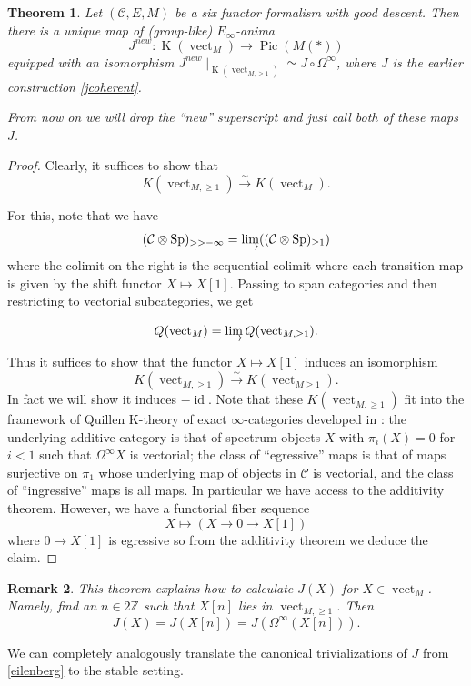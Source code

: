 \documentclass[12pt]{article}
\newtheorem{theorem}{Theorem}[section]
\newtheorem{remark}[theorem]{Remark}
\newcommand{\on}{\operatorname}
\newcommand{\mc}{\mathcal}
\newcommand{\mbb}{\mathbb}
\begin{document}
\begin{theorem}\label{jextend}
Let $(\mc{C},E,M)$ be a six functor formalism with good descent.  Then there is a unique map of (group-like) $E_\infty$-anima
$$J^{new}:\on{K}(\on{vect}_M)\to \on{Pic}(M(\ast))$$
equipped with an isomorphism $J^{new}\mid_{\on{K}(\on{vect}_{M,\geq 1})}\simeq  J\circ \Omega^\infty$, where $J$ is the earlier construction \ref{jcoherent}.

From now on we will drop the ``new'' superscript and just call both of these maps $J$.
\end{theorem}
\begin{proof}
Clearly, it suffices to show that
$$K(\on{vect}_{M,\geq 1})\overset{\sim}{\rightarrow} K(\on{vect}_M).$$

For this, note that we have
$$(\mc{C}\otimes \on{Sp})_{>>-\infty} = \varinjlim ((\mc{C}\otimes \on{Sp})_{\geq 1})$$
where the colimit on the right is the sequential colimit where each transition map is given by the shift functor $X\mapsto X[1]$. Passing to span categories and then restricting to vectorial subcategories, we get

$$Q(\on{vect}_M) = \varinjlim Q(\on{vect}_{M,\geq 1}).$$

Thus it suffices to show that the functor $X\mapsto X[1]$ induces an isomorphism
$$K(\on{vect}_{M,\geq 1})\overset{\sim}{\rightarrow} K(\on{vect}_{M\geq 1}).$$
In fact we will show it induces $-\on{id}$.  Note that these $K(\on{vect}_{M,\geq 1})$ fit into the framework of Quillen K-theory of exact $\infty$-categories developed in \cite{BarwickQ}: the underlying additive category is that of spectrum objects $X$ with $\pi_i(X)=0$ for $i<1$ such that $\Omega^\infty X$ is vectorial; the class of ``egressive'' maps is that of maps surjective on $\pi_1$ whose underlying map of objects in $\mc{C}$ is vectorial, and the class of ``ingressive'' maps is all maps.  In particular we have access to the additivity theorem.  However, we have a functorial fiber sequence
$$X \mapsto (X \to 0 \to X[1])$$
where $0\to X[1]$ is egressive so from the additivity theorem we deduce the claim.
\end{proof}

\begin{remark}
This theorem explains how to calculate $J(X)$ for $X\in\on{vect}_M$.  Namely, find an $n\in 2\mbb{Z}$ such that $X[n]$ lies in $\on{vect}_{M,\geq 1}$.  Then
$$J(X) = J(X[n]) = J(\Omega^\infty(X[n])).$$
\end{remark}

We can completely analogously translate the canonical trivializations of $J$ from \ref{eilenberg} to the stable setting.
\end{document}
